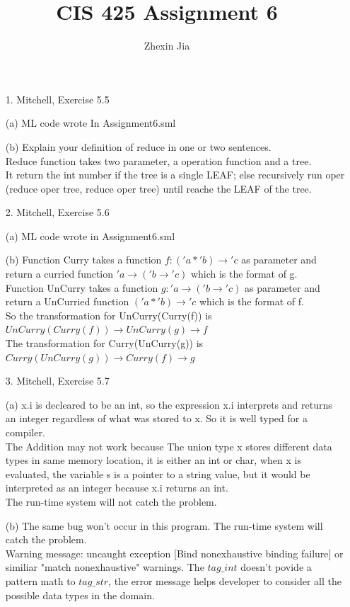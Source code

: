 \documentclass[12pt]{article}
\begin{document}
\author{Zhexin Jia}
\title{CIS 425 Assignment 6}
\maketitle
\begin{enumerate}
\item[1.] Mitchell, Exercise 5.5
\item[(a)] ML code wrote In Assignment6.sml
\item[(b)] Explain your definition of reduce in one or two sentences.\\
Reduce function takes two parameter, a operation function and a tree.\\
It return the int number if the tree is a single LEAF; else recursively run oper (reduce oper tree, reduce oper tree) until reache the LEAF of the tree.\\
\item[2.] Mitchell, Exercise 5.6
\item[(a)] ML code wrote in Assignment6.sml
\item[(b)] Function Curry takes a function $f:('a * 'b)\to 'c$ as parameter and return a curried function $'a\to('b\to'c)$ which is the format of g.\\
Function UnCurry takes a function $g: 'a\to('b\to'c)$ as parameter and return a UnCurried function $('a * 'b)\to'c$ which is the format of f.\\
So the transformation for UnCurry(Curry(f)) is $UnCurry(Curry(f)) \to UnCurry(g) \to f$\\
The transformation for Curry(UnCurry(g)) is $Curry(UnCurry(g))\to Curry(f) \to g$
\item[3.] Mitchell, Exercise 5.7
\item[(a)]x.i is decleared to be an int, so the expression x.i interprets and returns an integer regardless of what was stored to x. So it is well typed for a compiler.\\
The Addition may not work because The union type x stores different data types in same memory location, it is either an int or char, when x is evaluated, the variable s is a pointer to a string value, but it would be interpreted as an integer because x.i returns an int. \\
The run-time system will not catch the problem.
\item[(b)]The same bug won't occur in this program. The run-time system will catch the problem.\\
Warning message: uncaught exception [Bind nonexhaustive binding failure] or similiar "match nonexhaustive" warnings. The $tag\_int$ doesn't povide a pattern math to $tag\_str$, the error message helps developer to consider all the possible data types in the domain.

\end{enumerate}
\end{document}
